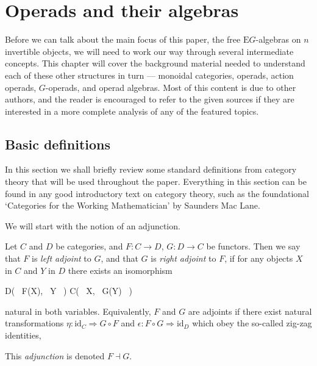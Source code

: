 \chapter{Operads and their algebras} \label{actionoperad} 

Before we can talk about the main focus of this paper, the free $\mathrm{E}G$-algebras on $n$ invertible objects, we will need to work our way through several intermediate concepts. This chapter will cover the background material needed to understand each of these other structures in turn --- monoidal categories, operads, action operads, $G$-operads, and operad algebras. Most of this content is due to other authors, and the reader is encouraged to refer to the given sources if they are interested in a more complete analysis of any of the featured topics. 

\section{Basic definitions}

In this section we shall briefly review some standard definitions from category theory that will be used throughout the paper. Everything in this section can be found in any good introductory text on category theory, such as the foundational `Categories for the Working Mathematician' \cite{cwm} by Saunders Mac Lane.

We will start with the notion of an adjunction.

\begin{defn} Let $C$ and $D$ be categories, and $F: C \to D$, $G: D \to C$ be functors. Then we say that $F$ is \emph{left adjoint} to $G$, and that $G$ is \emph{right adjoint} to $F$, if for any objects $X$ in $C$ and $Y$ in $D$ there exists an isomorphism
\begin{eq*} D\big( \, F(X), \,  Y \, \big) \quad \cong \quad C\big( \, X, \, G(Y) \, \big) \end{eq*}
natural in both variables. Equivalently, $F$ and $G$ are adjoints if there exist natural transformations $\eta: \mathrm{id}_{C} \Rightarrow G \circ F$ and $\epsilon : F \circ G \Rightarrow \mathrm{id}_{D}$ which obey the so-called zig-zag identities,
\begin{eq*}  \end{eq*}
This \emph{adjunction} is denoted $F \dashv G$.
\end{defn}

